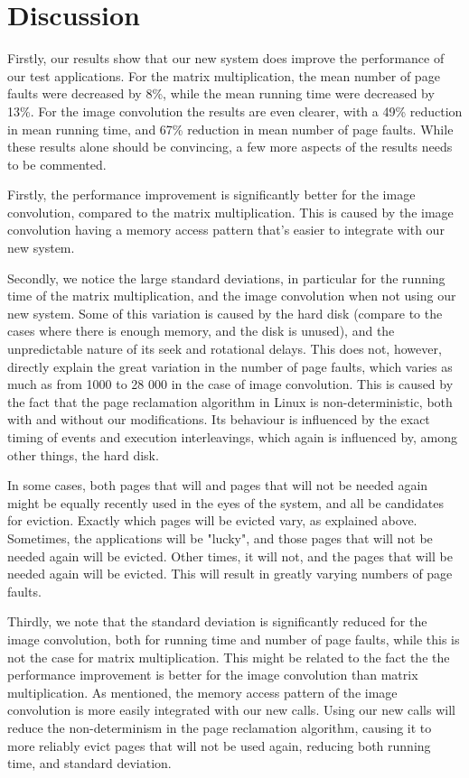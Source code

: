 \documentclass[10pt,a4paper,twocolumn]{article}
\begin{document}
\section{Discussion}

Firstly, our results show that our new system does improve the performance of our test applications.
For the matrix multiplication, the mean number of page faults were decreased by 8\%, while the mean
running time were decreased by 13\%. For the image convolution the results are even clearer, with a
49\% reduction in mean running time, and 67\% reduction in mean number of page faults. While these
results alone should be convincing, a few more aspects of the results needs to be commented.

Firstly, the performance improvement is significantly better for the image convolution, compared to
the matrix multiplication. This is caused by the image convolution having a memory access pattern
that's easier to integrate with our new system.

Secondly, we notice the large standard deviations, in particular for the running time of the matrix
multiplication, and the image convolution when not using our new system. Some of this variation is
caused by the hard disk (compare to the cases where there is enough memory, and the disk is unused),
and the unpredictable nature of its seek and rotational delays. This does not, however, directly
explain the great variation in the number of page faults, which varies as much as from 1000 to 28
000 in the case of image convolution. This is caused by the fact that the page reclamation algorithm
in Linux is non-deterministic, both with and without our modifications. Its behaviour is influenced
by the exact timing of events and execution interleavings, which again is influenced by, among other
things, the hard disk.

In some cases, both pages that will and pages that will not be needed again might be equally
recently used in the eyes of the system, and all be candidates for eviction. Exactly which pages
will be evicted vary, as explained above. Sometimes, the applications will be "lucky", and those
pages that will not be needed again will be evicted. Other times, it will not, and the pages that
will be needed again will be evicted. This will result in greatly varying numbers of page faults.

Thirdly, we note that the standard deviation is significantly reduced for the image convolution,
both for running time and number of page faults, while this is not the case for matrix
multiplication. This might be related to the fact the the performance improvement is better for the
image convolution than matrix multiplication. As mentioned, the memory access pattern of the image
convolution is more easily integrated with our new calls. Using our new calls will reduce the
non-determinism in the page reclamation algorithm, causing it to more reliably evict pages that will
not be used again, reducing both running time, and standard deviation.
\end{document}
